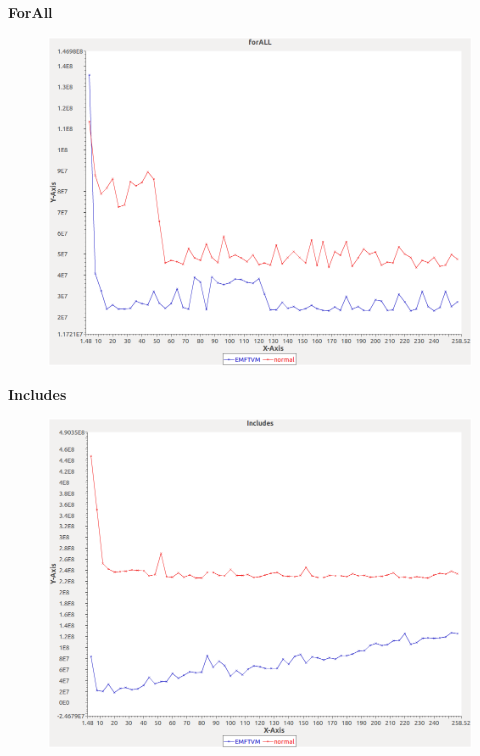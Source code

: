 \noindent\textbf{ForAll}

\begin{figure}[h]
\centering
\includegraphics[width=\textwidth]{../graphs/bag/forALL}
\end{figure}
\pagebreak

\noindent\textbf{Includes}

\begin{figure}[h]
\centering
\includegraphics[width=\textwidth]{../graphs/bag/Includes}
\end{figure}
\pagebreak

